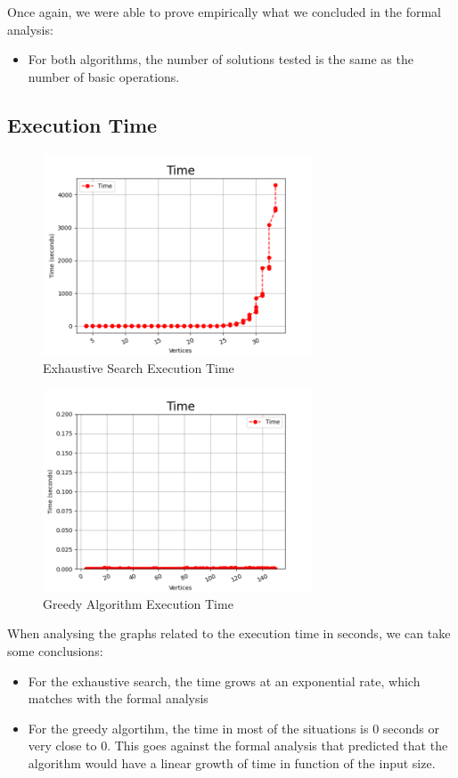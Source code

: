 \documentclass[]{revdetua}
\begin{document}
Once again, we were able to prove empirically what we concluded in the formal analysis:

\begin{itemize}
\item For both algorithms, the number of solutions tested is the same as the number of basic operations.
\end{itemize}

\subsection{Execution Time}

\begin{figure}[h]
    \centering
    \includegraphics[width=8cm]{time_exhaustive.png}
    \caption{Exhaustive Search Execution Time}
\end{figure}

\begin{figure}[h]
    \centering
    \includegraphics[width=8cm]{time_greedy.png}
    \caption{Greedy Algorithm Execution Time}
\end{figure}

When analysing the graphs related to the execution time in seconds, we can take some conclusions:

\begin{itemize}
    \item For the exhaustive search, the time grows at an exponential rate, which matches with the formal analysis
    \item For the greedy algortihm, the time in most of the situations is 0 seconds or very close to 0. This goes against the formal analysis that predicted that the algorithm would have a linear growth of time in function of the input size.
\end{itemize}
\end{document}
